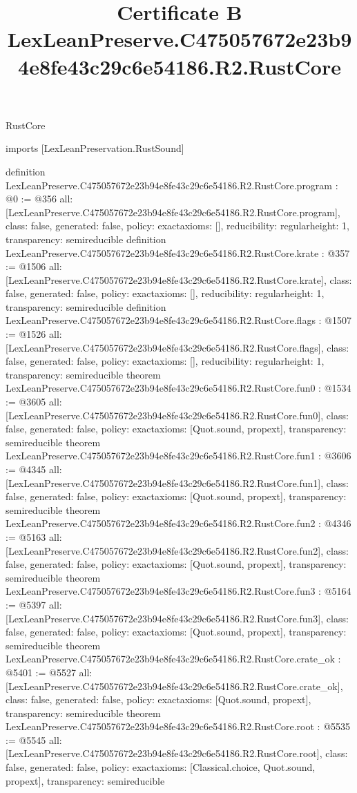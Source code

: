 \begin{lexlean}{RustCore}
\title{Certificate B LexLeanPreserve.C475057672e23b94e8fe43c29c6e54186.R2.RustCore}
\begin{coremodule}
imports [LexLeanPreservation.RustSound]

definition LexLeanPreserve.C475057672e23b94e8fe43c29c6e54186.R2.RustCore.program : @0 := @356 {
  all: [LexLeanPreserve.C475057672e23b94e8fe43c29c6e54186.R2.RustCore.program],
  class: false,
  generated: false,
  policy: exact{axioms: []},
  reducibility: regular{height: 1},
  transparency: semireducible
}
definition LexLeanPreserve.C475057672e23b94e8fe43c29c6e54186.R2.RustCore.krate : @357 := @1506 {
  all: [LexLeanPreserve.C475057672e23b94e8fe43c29c6e54186.R2.RustCore.krate],
  class: false,
  generated: false,
  policy: exact{axioms: []},
  reducibility: regular{height: 1},
  transparency: semireducible
}
definition LexLeanPreserve.C475057672e23b94e8fe43c29c6e54186.R2.RustCore.flags : @1507 := @1526 {
  all: [LexLeanPreserve.C475057672e23b94e8fe43c29c6e54186.R2.RustCore.flags],
  class: false,
  generated: false,
  policy: exact{axioms: []},
  reducibility: regular{height: 1},
  transparency: semireducible
}
theorem LexLeanPreserve.C475057672e23b94e8fe43c29c6e54186.R2.RustCore.fun0 : @1534 := @3605 {
  all: [LexLeanPreserve.C475057672e23b94e8fe43c29c6e54186.R2.RustCore.fun0],
  class: false,
  generated: false,
  policy: exact{axioms: [Quot.sound, propext]},
  transparency: semireducible
}
theorem LexLeanPreserve.C475057672e23b94e8fe43c29c6e54186.R2.RustCore.fun1 : @3606 := @4345 {
  all: [LexLeanPreserve.C475057672e23b94e8fe43c29c6e54186.R2.RustCore.fun1],
  class: false,
  generated: false,
  policy: exact{axioms: [Quot.sound, propext]},
  transparency: semireducible
}
theorem LexLeanPreserve.C475057672e23b94e8fe43c29c6e54186.R2.RustCore.fun2 : @4346 := @5163 {
  all: [LexLeanPreserve.C475057672e23b94e8fe43c29c6e54186.R2.RustCore.fun2],
  class: false,
  generated: false,
  policy: exact{axioms: [Quot.sound, propext]},
  transparency: semireducible
}
theorem LexLeanPreserve.C475057672e23b94e8fe43c29c6e54186.R2.RustCore.fun3 : @5164 := @5397 {
  all: [LexLeanPreserve.C475057672e23b94e8fe43c29c6e54186.R2.RustCore.fun3],
  class: false,
  generated: false,
  policy: exact{axioms: [Quot.sound, propext]},
  transparency: semireducible
}
theorem LexLeanPreserve.C475057672e23b94e8fe43c29c6e54186.R2.RustCore.crate_ok : @5401 := @5527 {
  all: [LexLeanPreserve.C475057672e23b94e8fe43c29c6e54186.R2.RustCore.crate_ok],
  class: false,
  generated: false,
  policy: exact{axioms: [Quot.sound, propext]},
  transparency: semireducible
}
theorem LexLeanPreserve.C475057672e23b94e8fe43c29c6e54186.R2.RustCore.root : @5535 := @5545 {
  all: [LexLeanPreserve.C475057672e23b94e8fe43c29c6e54186.R2.RustCore.root],
  class: false,
  generated: false,
  policy: exact{axioms: [Classical.choice, Quot.sound, propext]},
  transparency: semireducible
}


\end{coremodule}
\end{lexlean}
